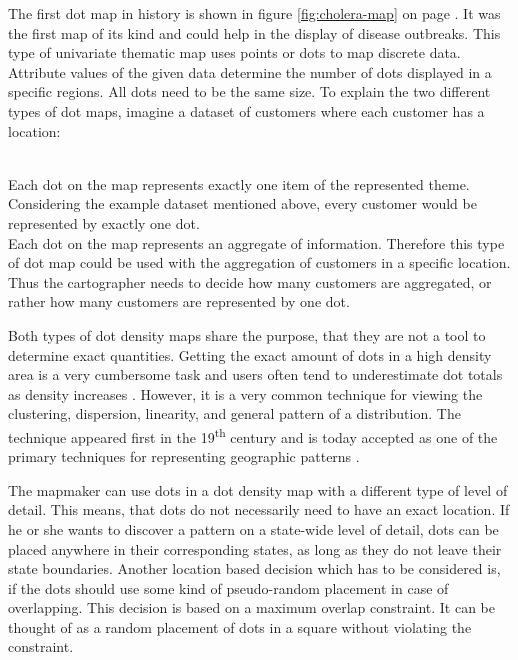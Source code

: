 The first dot map in history is shown in figure \ref{fig:cholera-map} on page \pageref{fig:cholera-map}. It was the first map of its kind and could help in the display of disease outbreaks. This type of univariate thematic map uses points or dots to map discrete data. Attribute values of the given data determine the number of dots displayed in a specific regions. All dots need to be the same size. To explain the two different types of dot maps, imagine a dataset of customers where each customer has a location:

\begin{enumerate}
 \hfill \\
Each dot on the map represents exactly one item of the represented theme. Considering the example dataset mentioned above, every customer would be represented by exactly one dot.
 \hfill \\
Each dot on the map represents an aggregate of information. Therefore this type of dot map could be used with the aggregation of customers in a specific location. Thus the cartographer needs to decide how many customers are aggregated, or rather how many customers are represented by one dot.
\end{enumerate}

Both types of dot density maps share the purpose, that they are not a tool to determine exact quantities. Getting the exact amount of dots in a high density area is a very cumbersome task and users often tend to underestimate dot totals as density increases . However, it is a very common technique for viewing the clustering, dispersion, linearity, and general pattern of a distribution. The technique appeared first in the 19\textsuperscript{th} century and is today accepted as one of the primary techniques for representing geographic patterns .

The mapmaker can use dots in a dot density map with a different type of level of detail. This means, that dots do not necessarily need to have an exact location. If he or she wants to discover a pattern on a state-wide level of detail, dots can be placed anywhere in their corresponding states, as long as they do not leave their state boundaries.
Another location based decision which has to be considered is, if the dots should use some kind of pseudo-random placement in case of overlapping. This decision is based on a maximum overlap constraint. It can be thought of as a random placement of dots in a square without violating the constraint.

